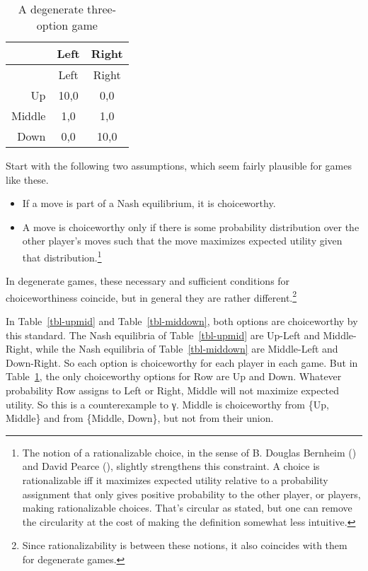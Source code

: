 \documentclass[
  11pt,
  letterpaper,
  DIV=11,
  numbers=noendperiod,
  twoside]{scrartcl}
\providecommand{\tightlist}{%
  \setlength{\itemsep}{0pt}\setlength{\parskip}{0pt}}
\begin{document}
\begin{longtable}[]{@{}rcc@{}}
\caption{A degenerate three-option
game}\label{tbl-allthree}\tabularnewline
\toprule\noalign{}
& Left & Right \\
\midrule\noalign{}
\endfirsthead
\toprule\noalign{}
& Left & Right \\
\midrule\noalign{}
\endhead
\bottomrule\noalign{}
\endlastfoot
Up & 10,0 & 0,0 \\
Middle & 1,0 & 1,0 \\
Down & 0,0 & 10,0 \\
\end{longtable}

Start with the following two assumptions, which seem fairly plausible
for games like these.

\begin{itemize}
\tightlist
\item
  If a move is part of a Nash equilibrium, it is choiceworthy.
\item
  A move is choiceworthy only if there is some probability distribution
  over the other player's moves such that the move maximizes expected
  utility given that distribution.\footnote{The notion of a
    rationalizable choice, in the sense of B. Douglas Bernheim
    () and David Pearce
    (), slightly strengthens this
    constraint. A choice is rationalizable iff it maximizes expected
    utility relative to a probability assignment that only gives
    positive probability to the other player, or players, making
    rationalizable choices. That's circular as stated, but one can
    remove the circularity at the cost of making the definition somewhat
    less intuitive.}
\end{itemize}

In degenerate games, these necessary and sufficient conditions for
choiceworthiness coincide, but in general they are rather
different.\footnote{Since rationalizability is between these notions, it
  also coincides with them for degenerate games.}

In Table~\ref{tbl-upmid} and Table~\ref{tbl-middown}, both options are
choiceworthy by this standard. The Nash equilibria of
Table~\ref{tbl-upmid} are Up-Left and Middle-Right, while the Nash
equilibria of Table~\ref{tbl-middown} are Middle-Left and Down-Right. So
each option is choiceworthy for each player in each game. But in
Table~\ref{tbl-allthree}, the only choiceworthy options for Row are Up
and Down. Whatever probability Row assigns to Left or Right, Middle will
not maximize expected utility. So this is a counterexample to γ. Middle
is choiceworthy from \{Up, Middle\} and from \{Middle, Down\}, but not
from their union.
\end{document}
